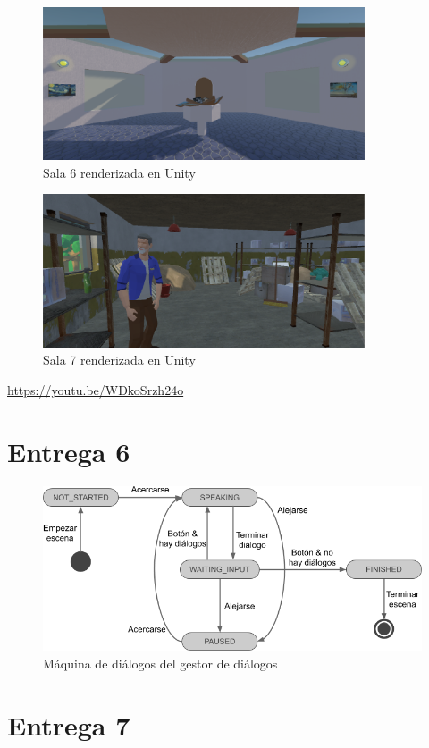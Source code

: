 \begin{figure}[!h]
\begin{center}
\includegraphics[width=0.85\textwidth]{imagenes/7/salas-unity/unity-sala-6.png}
\caption{Sala 6 renderizada en Unity}
\label{fig:unity-sala-6}
\end{center}
\end{figure}

\begin{figure}[!h]
\begin{center}
\includegraphics[width=0.85\textwidth]{imagenes/7/salas-unity/unity-sala-7.png}
\caption{Sala 7 renderizada en Unity}
\label{fig:unity-sala-7}
\end{center}
\end{figure}

\begin{center}
    \url{https://youtu.be/WDkoSrzh24o}
\end{center}

\section{Entrega 6}

\begin{figure}[!h]
\begin{center}
\includegraphics[width=1\textwidth]{imagenes/7/maquina-estados-dialogos.png}
\caption{Máquina de diálogos del gestor de diálogos}
\label{fig:dialogs-state-machine}
\end{center}
\end{figure}

\section{Entrega 7}

